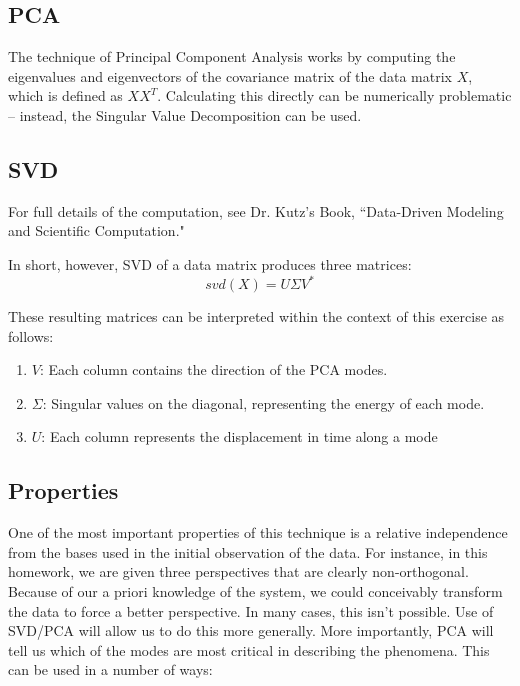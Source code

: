 \documentclass[journal]{IEEEtran}
\newcommand{\myMatrix}[1]{\bm{\mathit{#1}}}
\begin{document}
\subsection{PCA}
 The technique of Principal Component Analysis works by computing the eigenvalues and eigenvectors
 of the covariance matrix of the data matrix $ \myMatrix{X} $, which is defined as
 $ \myMatrix{X}\myMatrix{X}^{T} $. Calculating this directly can be numerically problematic --
 instead, the Singular Value Decomposition can be used.

 \subsection{SVD}
For full details of the computation, see Dr. Kutz's Book, ``Data-Driven Modeling and Scientific
Computation."

In short, however, SVD of a data matrix produces three matrices:
\begin{equation}
    svd(\myMatrix{X})=\myMatrix{U} \myMatrix{\Sigma} \myMatrix{V}^{*} 
\end{equation}

These resulting matrices can be interpreted within the context of this exercise as follows:
\begin{enumerate}
    \item $\myMatrix{V}$: Each column contains the direction of the PCA modes.
    \item $\myMatrix{\Sigma}$: Singular values on the diagonal, representing the energy of each mode.
    \item $\myMatrix{U}$: Each column represents the displacement in time along a mode
\end{enumerate}

\subsection{Properties}

One of the most important properties of this technique is a relative independence from the bases
used in the initial observation of the data. For instance, in this homework, we are given three
perspectives that are clearly non-orthogonal. Because of our a priori knowledge of the system, we
could conceivably transform the data to force a better perspective. In many cases, this isn't
possible. Use of SVD/PCA will allow us to do this more generally. More importantly, PCA will tell
us which of the modes are most critical in describing the phenomena. This can be used in a number
of ways:
\end{document}
